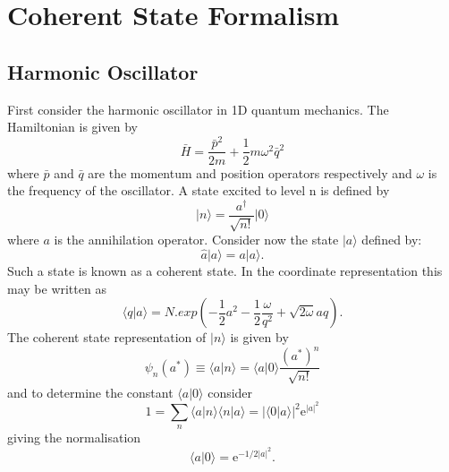 
\chapter{Coherent State Formalism} %

\label{AppendixA} %

\section{Harmonic Oscillator}
First consider the harmonic oscillator in 1D quantum mechanics. The Hamiltonian is given by
\begin{equation}
{\bar H} = \frac{{\bar p}^2}{2m}+\frac{1}{2}m\omega^2{\bar q}^2
\end{equation}
where ${\bar p}$ and ${\bar q}$ are the momentum and position operators respectively and $\omega$ is the frequency of the oscillator. A state excited to level n is defined by
\begin{equation*}
\vert n \rangle = \frac{a^{\dagger}}{\sqrt{n!}}\vert 0 \rangle 
\end{equation*}
where $a$ is the annihilation operator. Consider now the state $\vert a \rangle$ defined by:
\begin{equation}
{\hat a} \vert a \rangle = a \vert a \rangle.
\end{equation}
Such a state is known as a coherent state. In the coordinate representation this may be written as
\begin{equation}
\label{harmcoh}
\langle q \vert a \rangle = N.exp(-\frac{1}{2}a^2-\frac{1}{2}\frac{\omega}{q^2}+\sqrt{2\omega}aq).
\end{equation}
The coherent state representation of $\vert n \rangle$ is given by
\begin{equation}
\psi_n(a^*) \equiv \langle a \vert n \rangle = \langle a \vert 0 \rangle \frac{(a^*)^n}{\sqrt{n!}}
\end{equation}
and to determine the constant $\langle a \vert 0 \rangle$ consider
\begin{equation}
1 = \sum_n \langle a \vert n \rangle \langle n \vert a \rangle =  {\vert \langle 0 \vert a \rangle \vert}^2 \mathrm{e}^{{\vert a \vert}^2}
\end{equation}
giving the normalisation
\begin{equation}
\langle a \vert 0 \rangle = \mathrm{e}^{-1/2{\vert a \vert}^2}.
\end{equation}
